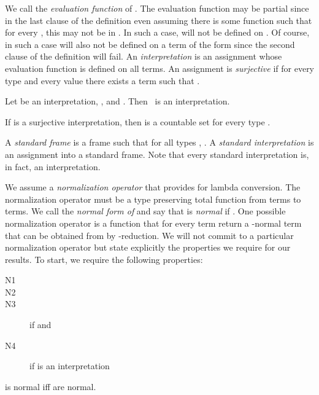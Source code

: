 We call  the \emph{evaluation function} of
.  
The evaluation function may be partial since in the last clause  of the definition even assuming there is some function  such that  for every , this  may not be in .  In such a case,  will not be defined on .  Of course, in such a case  will also not be defined on a term of the form  since
the second clause of the definition will fail. An \emph{interpretation} is an
assignment whose evaluation function is defined on
all terms.  An assignment  is
\emph{surjective} if for every type  and every
value  there exists a term 
such that .

\begin{prop}
  Let  be an interpretation, ,
  and .  Then~ is an
  interpretation.
\end{prop}



\begin{prop}
  If  is a surjective interpretation, then
   is a countable set for every type
  .
\end{prop}

A \emph{standard frame} is a frame  such that
 for all
types , .  A \emph{standard
  interpretation} is an assignment into a standard
frame.  Note that every standard interpretation is, in fact, an
interpretation.

We assume a \emph{normalization operator } that provides for lambda conversion.  The normalization
operator  must be a type preserving total function from terms to terms.  We call  the
\emph{normal form of } and say that  is
\emph{normal} if .  One possible
normalization operator is a function that for every
term  return a -normal term that can be
obtained from  by -reduction.  We will not
commit to a particular normalization operator but state
explicitly the properties we require for our results.
To start, we require the following properties:
\begin{description}
\item[{N1}~] 
\item[{N2}~] 
\item[{N3}~]  
  \quad if  and 
\item[{N4}~] 
  \quad if  is an interpretation
\end{description}

\begin{prop}
   is normal iff  are normal.
\end{prop}



